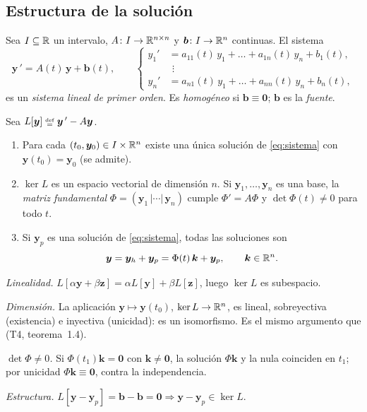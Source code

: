 \documentclass[11pt,twoside]{article}
\newcommand\vy{\bm{y}}
\newcommand\vb{\bm{b}}
\newcommand\vk{\bm{k}}
\newcommand\vz{\bm{z}}
\begin{document}
\subsection{Estructura de la solución}

\begin{definicion}\label{def:sistema}
Sea $I\subseteq\mathbb{R}$ un intervalo, $A\colon I\to\mathbb{R}^{n\times n}$ y $\vb\colon I\to\R^n$ continuas. El sistema
\begin{equation}\label{eq:sistema}
\vy\,'=A(t)\,\vy+\vb(t),\qquad
\left\{\begin{aligned}
y_1'&=a_{11}(t)\,y_1+\dots+a_{1n}(t)\,y_n+b_1(t),\\[-2pt]
&\ \,\vdots\\[-2pt]
y_n'&=a_{n1}(t)\,y_1+\dots+a_{nn}(t)\,y_n+b_n(t),
\end{aligned}\right.
\end{equation}
es un \emph{sistema lineal de primer orden}. Es \emph{homogéneo} si $\vb\equiv\bm 0$; $\vb$ es la \emph{fuente}.
\end{definicion}

\begin{teorema}\label{teo:estructura}
Sea $L[\vy]\defeq\vy\,'-A\vy$.
\begin{enumerate}
\item Para cada $(t_0,\vy_0)\in I\times\R^n$ existe una única solución de \eqref{eq:sistema} con $\vy(t_0)=\vy_0$ (se admite).
\item $\ker L$ es un espacio vectorial de dimensión $n$. Si $\vy_1,\dots,\vy_n$ es una base, la \emph{matriz
fundamental} $\Phi=(\vy_1\,|\cdots|\,\vy_n)$ cumple $\Phi'=A\Phi$ y $\det\Phi(t)\neq0$ para todo $t$.
\item Si $\vy_p$ es una solución de \eqref{eq:sistema}, todas las soluciones son
\begin{equation}\label{eq:yh+yp}
\vy=\vy_h+\vy_p=\Phi(t)\,\vk+\vy_p,\qquad \vk\in\R^n.
\end{equation}
\end{enumerate}
\end{teorema}

\begin{demostracion}
\begin{pasos}
\item \emph{Linealidad.} $L[\alpha\vy+\beta\vz]=\alpha L[\vy]+\beta L[\vz]$, luego $\ker L$ es subespacio.
\item \emph{Dimensión.} La aplicación $\vy\mapsto\vy(t_0)$, $\ker L\to\mathbb{R}^n$, es lineal, sobreyectiva (existencia) e
inyectiva (unicidad): es un isomorfismo. Es el mismo argumento que (T4, teorema~1.4).
\item \emph{$\det\Phi\neq0$.} Si $\Phi(t_1)\vk=\bm 0$ con $\vk\neq\bm0$, la solución $\Phi\vk$ y la nula coinciden en
$t_1$; por unicidad $\Phi\vk\equiv\bm0$, contra la independencia.
\item \emph{Estructura.} $L[\vy-\vy_p]=\vb-\vb=\bm0\Rightarrow\vy-\vy_p\in\ker L$.
\end{pasos}
\end{demostracion}
\end{document}
